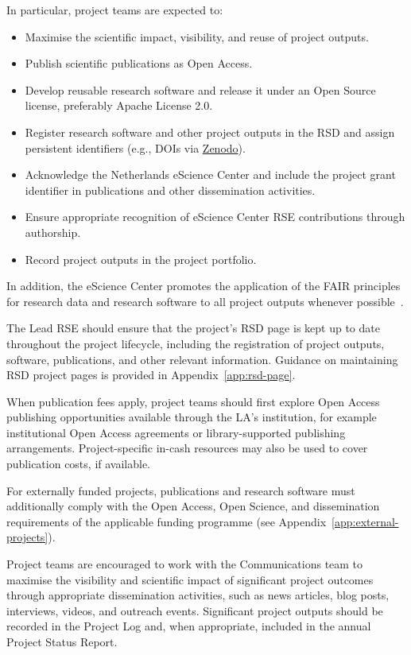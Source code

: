 In particular, project teams are expected to:
\vspace{-0.2cm}
\begin{itemize}\itemsep0em
 \item Maximise the scientific impact, visibility, and reuse of project outputs.
 \item Publish scientific publications as Open Access.
 \item Develop reusable research software and release it under an Open Source license, preferably Apache License 2.0.
 \item Register research software and other project outputs in the RSD and assign persistent identifiers (e.g., DOIs
 via \href{https://zenodo.org/communities/nlesc/}{Zenodo}). 
 \item Acknowledge the Netherlands eScience Center and include the project grant identifier in publications and other 
 dissemination activities.
 \item Ensure appropriate recognition of eScience Center RSE contributions through authorship.
 \item Record project outputs in the project portfolio.
\end{itemize}
\vspace{-0.2cm}

In addition, the eScience Center promotes the application of the FAIR principles for research data and research
software to all project outputs whenever possible~\cite{fair-principles,FAIR4RS}.

The Lead RSE should ensure that the project's RSD page is kept up to date throughout the project lifecycle, including
the registration of project outputs, software, publications, and other relevant information. Guidance on maintaining
RSD project pages is provided in Appendix~\ref{app:rsd-page}.

When publication fees apply, project teams should first explore Open Access publishing opportunities available through
the LA's institution, for example institutional Open Access agreements or library-supported publishing arrangements.
Project-specific in-cash resources may also be used to cover publication costs, if available.

For externally funded projects, publications and research software must additionally comply with the Open Access,
Open Science, and dissemination requirements of the applicable funding programme (see
Appendix~\ref{app:external-projects}).

Project teams are encouraged to work with the Communications team to maximise the visibility and scientific impact of
significant project outcomes through appropriate dissemination activities, such as news articles, blog posts,
interviews, videos, and outreach events. Significant project outputs should be recorded in the Project Log and,
when appropriate, included in the annual Project Status Report.

